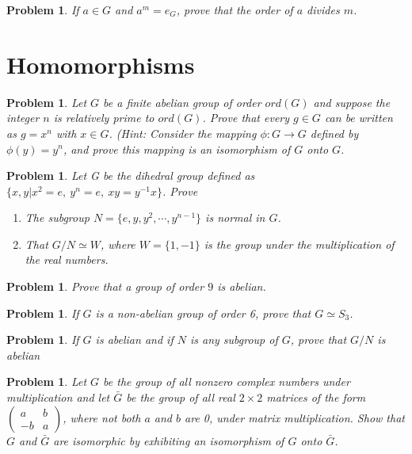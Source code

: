 \documentclass[12pt]{amsart}
\newtheorem{prob}[thm]{Problem}
\theoremstyle{definition}
\theoremstyle{remark}
\numberwithin{equation}{section}
\begin{document}
\begin{prob}
	If $a \in G$ and $a^m = e_G$, prove that the order of $a$ divides $m$. 
\end{prob}

\section{Homomorphisms}
\begin{prob}
	Let $G$ be a finite abelian group of order $ord(G)$ and suppose the integer
	$n$ is relatively prime to $ord(G)$. Prove that every $g \in  G$ can be written
	as $g = x^n$ with $x \in G$. ({\sc Hint}: Consider the mapping $\phi :G \to G$
	defined by $\phi(y) = y^n$, and prove this mapping is an isomorphism
	of $G$ onto $G$. 
\end{prob}

\begin{prob}
	Let G be the dihedral group defined as $\{
	x,y |x^2 =e,\ y^n = e,\ xy =
	y^{-1}x\}$. Prove
	\begin{enumerate}
		\item The subgroup $N = \{e,y,y^2 ,\cdots,y^{n-1} \}$ is normal in $G$.
		\item That $G/N \simeq W$, where $W = \{1, -1\}$ is the group under
		the multiplication of the real numbers.
	\end{enumerate}

\end{prob}

\begin{prob}
	Prove that a group of order $9$ is abelian. 
\end{prob}

\begin{prob}
	If $G$ is a non-abelian group of order 6, prove that $G\simeq  S_3$.
\end{prob}

\begin{prob}
	 If $G$ is abelian and if $N$ is any subgroup of $G$, prove that $G/N$ is
	abelian
\end{prob}

\begin{prob}
	 Let $G$ be the group of all nonzero complex numbers under multiplication
	and let $\bar{G}$ be the group of all real $2 \times 2$ matrices of the form $
	\begin{pmatrix} 
		a & b \\
		-b & a 
	\end{pmatrix}$, where not both $a$ and $b$ are 0, under matrix multiplication. 
	Show that $G$ and $\bar{G}$ are isomorphic by exhibiting an isomorphism of
	$G$ onto $\bar{G}$. 
\end{prob}
\end{document}
